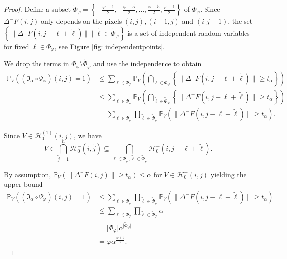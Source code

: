 \documentclass[a4paper,12pt]{article}
\newcommand{\abs}[1]{\lvert#1\rvert}
\newcommand{\norm}[1]{\lVert#1\rVert}
\theoremstyle{plain}
\theoremstyle{definition}
\begin{document}
\begin{proof}
	Define a subset $\tilde{\Phi}_\varphi = \left\{ -\frac{\varphi - 1}{2}, -\frac{\varphi - 5}{2}, \dots, \frac{\varphi - 5}{2}, \frac{\varphi - 1}{2} \right\}$ of $\Phi_\varphi$. Since $\Delta^- F(i, j)$ only depends on the pixels $(i, j), (i - 1, j)$ and $(i, j - 1)$, the set $\left\{ \norm{\Delta^- F(i, j - \ell + \tilde{\ell})} \mid \tilde{\ell} \in \tilde{\Phi}_\varphi \right\}$ is a set of independent random variables for fixed $\ell \in \Phi_\varphi$, see Figure \ref{fig: independentpoints}.
	
	
	
	We drop the terms in $\Phi_\varphi \setminus \tilde{\Phi}_\varphi$ and use the independence to obtain
	\begin{align*}
		\mathbb{P}_V\left( (\mathfrak{I}_\alpha \circ \Psi_\varphi)(i, j) = 1 \right) &\leq \sum_{\ell \in \Phi_\varphi} \mathbb{P}_V\left( \bigcap_{\tilde{\ell} \in \Phi_\varphi} \left\{ \norm{\Delta^- F(i, j - \ell + \tilde{\ell})} \geq t_\alpha \right\} \right) \\
		&\leq \sum_{\ell \in \Phi_\varphi} \mathbb{P}_V\left( \bigcap_{\tilde{\ell} \in \tilde{\Phi}_\varphi} \left\{ \norm{\Delta^- F(i, j - \ell + \tilde{\ell})} \geq t_\alpha \right\} \right) \\
		&= \sum_{\ell \in \Phi_\varphi} \prod_{\tilde{\ell} \in \tilde{\Phi}_\varphi} \mathbb{P}_V\left( \norm{\Delta^- F(i, j - \ell + \tilde{\ell})} \geq t_\alpha \right).
	\end{align*}
	
	Since $V \in \mathcal{H}_0^{(1)}(i, j)$, we have
	\begin{equation*}
		V \in \bigcap_{\tilde{j} = 1}^n \mathcal{H}_0^-(i, \tilde{j}) \subseteq \bigcap_{\ell \in \Phi_\varphi, \tilde{\ell} \in \tilde{\Phi}_\varphi} \mathcal{H}_0^-(i, j - \ell + \tilde{\ell}).
	\end{equation*}
	
	By assumption, $\mathbb{P}_V\left( \norm{\Delta^- F(i, j)} \geq t_\alpha \right) \leq \alpha$ for $V \in \mathcal{H}_0^-(i, j)$ yielding the upper bound
	\begin{align*}
		\mathbb{P}_V\left( (\mathfrak{I}_\alpha \circ \Psi_\varphi)(i, j) = 1 \right) &\leq \sum_{\ell \in \Phi_\varphi} \prod_{\tilde{\ell} \in \tilde{\Phi}_\varphi} \mathbb{P}_V\left( \norm{\Delta^- F(i, j - \ell + \tilde{\ell})} \geq t_\alpha \right) \\
		&\leq \sum_{\ell \in \Phi_\varphi} \prod_{\tilde{\ell} \in \tilde{\Phi}_\varphi} \alpha \\
		&= \abs{\Phi_\varphi} \alpha^{\abs{\tilde{\Phi}_\varphi}} \\
		&= \varphi \alpha^{\frac{\varphi + 1}{2}}.
	\end{align*}
	

\end{proof}
\end{document}
